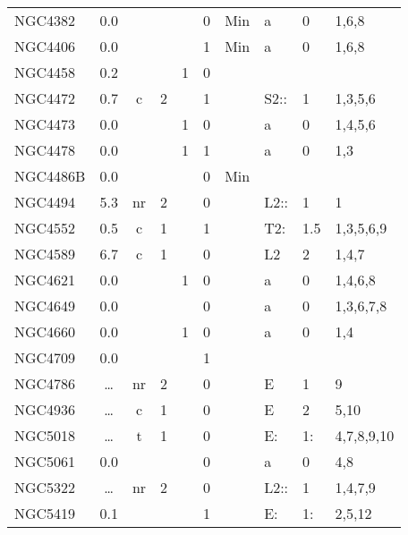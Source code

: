 \begin{tabular}{lcccccclll}
NGC4382     & 0.0 &     &    &               & 0 & Min      & a & 0  & 1,6,8         \\
NGC4406     & 0.0 &     &    &               & 1           & Min      & a & 0  & 1,6,8         \\
NGC4458     & 0.2 &     &    &  1      & 0 &          & &    &               \\
NGC4472     & 0.7 & c   & 2  &               & 1           &          & S2::   & 1  & 1,3,5,6        \\
NGC4473     & 0.0 &     &    &  1      & 0 &          & a & 0  & 1,4,5,6           \\
NGC4478     & 0.0 &     &    &  1      & 1           &          & a & 0  & 1,3               \\
NGC4486B    & 0.0 &     &    &               & 0 & Min      & &    &               \\
NGC4494     & 5.3 & nr  & 2  &               & 0 &          & L2::   & 1  & 1              \\
NGC4552     & 0.5 & c   & 1  &               & 1           &          & T2:    & 1.5& 1,3,5,6,9      \\
NGC4589     & 6.7 & c   & 1  &               & 0 &          & L2     & 2  & 1,4,7             \\
NGC4621     & 0.0 &     &    &  1      & 0 &          & a & 0  & 1,4,6,8           \\
NGC4649     & 0.0 &     &    &               & 0 &          & a & 0  & 1,3,6,7,8         \\
NGC4660     & 0.0 &     &    &  1      & 0 &          & a & 0  & 1,4               \\
NGC4709     & 0.0 &     &    &               & 1           &          & &    &               \\
NGC4786     & \dots &nr & 2  &               & 0 &          & E & 1  & 9             \\
NGC4936     & \dots &c  & 1  &               & 0 &          & E & 2  & 5,10             \\
NGC5018     & \dots &t  & 1  &               & 0 &          & E:     & 1: & 4,7,8,9,10     \\
NGC5061     & 0.0 &     &    &               & 0 &          & a & 0  & 4,8               \\
NGC5322     & \dots &nr & 2  &               & 0 &          & L2::   & 1  & 1,4,7,9        \\
NGC5419     & 0.1 &     &    &               & 1   &          & E:     & 1: & 2,5,12        \\

\end{tabular}
